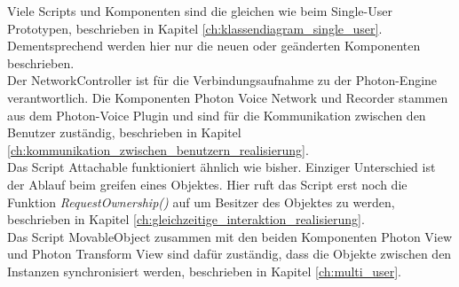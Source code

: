 Viele Scripts und Komponenten sind die gleichen wie beim Single-User Prototypen, beschrieben in Kapitel \ref{ch:klassendiagram_single_user}. Dementsprechend werden hier nur die neuen oder geänderten Komponenten beschrieben. \\
Der \grqq NetworkController\grqq{} ist für die Verbindungsaufnahme zu der Photon-Engine verantwortlich. Die Komponenten \grqq Photon Voice Network\grqq{} und \grqq Recorder\grqq{} stammen aus dem Photon-Voice Plugin und sind für die Kommunikation zwischen den Benutzer zuständig, beschrieben in Kapitel \ref{ch:kommunikation_zwischen_benutzern_realisierung}. \\
Das Script \grqq Attachable\grqq{} funktioniert ähnlich wie bisher. Einziger Unterschied ist der Ablauf beim greifen eines Objektes. Hier ruft das Script erst noch die Funktion \textit{RequestOwnership()} auf um Besitzer des Objektes zu werden, beschrieben in Kapitel \ref{ch:gleichzeitige_interaktion_realisierung}. \\
Das Script \grqq MovableObject\grqq{} zusammen mit den beiden Komponenten \grqq Photon View\grqq{} und \grqq Photon Transform View\grqq{} sind dafür zuständig, dass die Objekte zwischen den Instanzen synchronisiert werden, beschrieben in Kapitel \ref{ch:multi_user}.